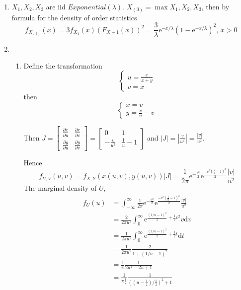 \documentclass{article}
\begin{document}
\begin{enumerate}[leftmargin = 0 em, label = \arabic*., font = \bfseries]
	

	\item 
	$X_1 , X_2, X_3 $ are iid $Exponential(\lambda)$. $X_{(3)} = \max{X_1, X_2, X_3}$, then by formula for the density of order statistics
	\[f_{X_{(3)}}(x) = 3 f_{X_1}(x) ( F_{X-1}(x))^{2} = \frac{3}{\lambda} \mathrm{e}^{- x /\lambda} (1 - \mathrm{e}^{- x / \lambda} )^2 ,\, x > 0\]
	
	
	

\item 
\begin{enumerate}
	\item
Define the transformation
\[\begin{cases}
	u = \frac{x}{x+y}\\
	v = x
\end{cases}\]
then
\[\begin{cases}
	x = v\\
	y = \frac{v}{u} - v
\end{cases}\]

Then
$J = \begin{bmatrix}
	\frac{\partial x}{\partial u} & \frac{\partial x}{\partial v}\\
	\frac{\partial y}{\partial u} & \frac{\partial y}{\partial v}
\end{bmatrix} = \begin{bmatrix}
	0 & 1 \\
	-\frac{v}{u^2} & \frac{1}{u} - 1
\end{bmatrix}$ and $|J| = \left|\frac{v}{u^2}\right| = \frac{|v|}{u^2}$.

Hence
\[f_{U,V}(u,v) = f_{X,Y}(x(u,v), y(u,v)) |J| = \frac{1}{2 \pi} \mathrm{e}^{-\frac{v^2}{2}} \mathrm{e}^{\frac{-v^2 (\frac{1}{u} -1)^2}{2}} \frac{|v|}{u^2}\]
The marginal density of $U$,
\begin{align*}
f_{U}(u) &= \int_{-\infty}^{\infty} \frac{1}{2 \pi} \mathrm{e}^{-\frac{v^2}{2}} \mathrm{e}^{\frac{-v^2 (\frac{1}{u} -1)^2}{2}} \frac{|v|}{u^2}\\
& = \frac{2}{2 \pi u^2} \int_{0}^{\infty}\mathrm{e}^{\frac{(1/u - 1)^2}{2} + \frac{1}{2}v^2} v \mathrm{d}v\\
& =  \frac{1}{2 \pi u^2} \int_{0}^{\infty} \mathrm{e}^{\frac{(1/u - 1)^2}{2} + \frac{1}{2}t}\mathrm{d}t\\
& = \frac{1}{2 \pi u^2} \frac{2}{1 + (1/u - 1)^2}\\
& = \frac{1}{\pi} \frac{1}{2 u^2 - 2 u +1}\\
& = \frac{1}{\pi \frac{1}{2}} \frac{1}{((u - \frac{1}{2}) / \frac{1}{2})^2 +1}
\end{align*}


\end{enumerate}
\end{enumerate}
\end{document}
